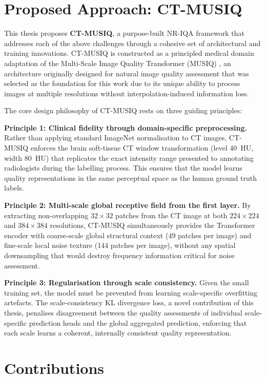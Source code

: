 \section{Proposed Approach: CT-MUSIQ}
\label{sec:intro_approach}

This thesis proposes \textbf{CT-MUSIQ}, a purpose-built NR-IQA framework that addresses
each of the above challenges through a cohesive set of architectural and training
innovations. CT-MUSIQ is constructed as a principled medical domain adaptation of the
Multi-Scale Image Quality Transformer (MUSIQ) \cite{ke2021musiq}, an architecture
originally designed for natural image quality assessment that was selected as the
foundation for this work due to its unique ability to process images at multiple
resolutions without interpolation-induced information loss.

The core design philosophy of CT-MUSIQ rests on three guiding principles:

\textbf{Principle 1: Clinical fidelity through domain-specific preprocessing.} Rather
than applying standard ImageNet normalisation to CT images, CT-MUSIQ enforces the brain
soft-tissue CT window transformation (level 40~HU, width 80~HU) that replicates the
exact intensity range presented to annotating radiologists during the labelling process.
This ensures that the model learns quality representations in the same perceptual space
as the human ground truth labels.

\textbf{Principle 2: Multi-scale global receptive field from the first layer.} By
extracting non-overlapping $32 \times 32$ patches from the CT image at both $224 \times
224$ and $384 \times 384$ resolutions, CT-MUSIQ simultaneously provides the Transformer
encoder with coarse-scale global structural context (49 patches per image) and fine-scale
local noise texture (144 patches per image), without any spatial downsampling that would
destroy frequency information critical for noise assessment.

\textbf{Principle 3: Regularisation through scale consistency.} Given the small
training set, the model must be prevented from learning scale-specific overfitting
artefacts. The scale-consistency KL divergence loss, a novel contribution of this thesis,
penalises disagreement between the quality assessments of individual scale-specific
prediction heads and the global aggregated prediction, enforcing that each scale learns
a coherent, internally consistent quality representation.

\section{Contributions}
\label{sec:intro_contributions}

